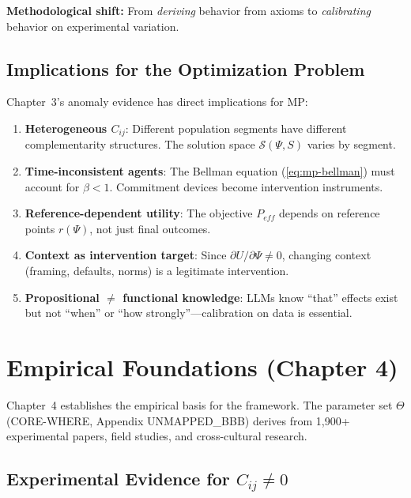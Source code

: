 \textbf{Methodological shift:} From \textit{deriving} behavior from axioms to
\textit{calibrating} behavior on experimental variation.

\subsection{Implications for the Optimization Problem}

Chapter~3's anomaly evidence has direct implications for MP:

\begin{enumerate}
\item \textbf{Heterogeneous $C_{ij}$}: Different population segments have different
      complementarity structures. The solution space $\mathcal{S}(\Psi, S)$ varies by segment.

\item \textbf{Time-inconsistent agents}: The Bellman equation (\ref{eq:mp-bellman})
      must account for $\beta < 1$. Commitment devices become intervention instruments.

\item \textbf{Reference-dependent utility}: The objective $P_{eff}$ depends on
      reference points $r(\Psi)$, not just final outcomes.

\item \textbf{Context as intervention target}: Since $\partial U/\partial \Psi \neq 0$,
      changing context (framing, defaults, norms) is a legitimate intervention.

\item \textbf{Propositional $\neq$ functional knowledge}: LLMs know ``that'' effects
      exist but not ``when'' or ``how strongly''---calibration on data is essential.
\end{enumerate}

\section{Empirical Foundations (Chapter 4)}
\label{sec:mp-empirical}

Chapter~4 establishes the empirical basis for the framework. The parameter set $\Theta$
(CORE-WHERE, Appendix UNMAPPED_BBB) derives from 1,900+ experimental papers, field studies,
and cross-cultural research.

\subsection{Experimental Evidence for $C_{ij} \neq 0$}

